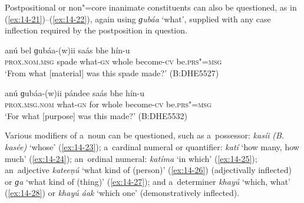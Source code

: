 Postpositional or non"=core inanimate constituents can also be questioned, as in (\ref{ex:14-21})--(\ref{ex:14-22}), again using \textit{ɡubáa} `what', supplied with any case inflection required by the postposition in question.

\begin{exe}
\ex
\label{ex:14-21}
\gll anú bel ɡubáa-(w)ii saás bhe  hín-u  \\
\textsc{prox.nom.msg} spade what-\textsc{gn} whole become-\textsc{cv}  be.\textsc{prs"=msg} \\
\glt `From what [material] was this spade made?' (B:DHE5527)

\ex
\label{ex:14-22}
\gll anú ɡubáa-(w)ii pándee saás bhe  hín-u \\
\textsc{prox.msg.nom} what-\textsc{gn} for whole become-\textsc{cv}  be.\textsc{prs"=msg} \\
\glt `For what [purpose] was this made?' (B:DHE5532)
\end{exe}

 Various modifiers of a~noun can be questioned,
such as a~possessor: \textit{kasíi} \textit{(B. kasée)} `whose' (\ref{ex:14-23});
a~cardinal numeral or quantifier: \textit{katí} `how many, how much' (\ref{ex:14-24});
an~ordinal numeral: \textit{katíma} `in which' (\ref{ex:14-25}); an~adjective
\textit{kateeṇú} `what kind of (person)' (\ref{ex:14-26}) (adjectivally inflected) or
\textit{ɡa} `what kind of (thing)' (\ref{ex:14-27}); and a~determiner \textit{khayú} `which,
what' (\ref{ex:14-28}) or \textit{khayú áak} `which one' (demonstratively inflected).

